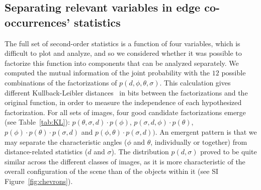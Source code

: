 \documentclass[a4paper]{article}
\begin{document}
\subsection{Separating relevant variables in edge co-occurrences' statistics}
The full set of second-order statistics is a function of four variables, 
which is difficult to plot and analyze, and so we considered 
whether it was possible to factorize this function into components that can be analyzed separately.  
We computed the mutual information of the joint probability 
with the $12$ possible combinations of the factorizations of $p(d, \phi, \theta, \sigma)$. 
This calculation gives different Kullback-Leibler distances~\autocite{Cha02} in bits 
between the factorizations and the original function, 
in order to measure the independence of each hypothesized factorization. 
For all sets of images, four good candidate factorizations emerge (see Table~\ref{tab:KL}): 
$p(\theta, \sigma, d)\cdot p(\phi)$, $p(\sigma, d, \phi)\cdot p(\theta)$, 
$p(\phi)\cdot p(\theta)\cdot p(\sigma, d)$ and $p(\phi, \theta)\cdot p(\sigma, d))$. 
An emergent pattern is that we may separate the characteristic angles 
($\phi$ and $\theta$, individually or together) 
from distance-related statistics ($d$ and $\sigma$). 
The distribution $p(d,\sigma)$ proved to be quite similar across the different classes of images, 
as it is more characteristic of the overall configuration of the scene 
than of the objects within it (see SI Figure~\ref{fig:chevrons}). 
\end{document}
